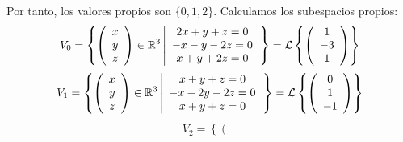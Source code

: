\documentclass[12pt]{article}
\begin{document}
\begin{ejercicio} 
\begin{enumerate}
        Por tanto, los valores propios son $\{0,1,2\}$. Calculamos los subespacios propios:
        \begin{equation*}
            \begin{split}
                V_0 = \left\{\left(\begin{array}{c}
                    x\\y\\z
                \end{array}\right)\in \mathbb{R}^3 \left|
                \begin{array}{c}
                    2x+y+z=0 \\
                    -x-y-2z=0 \\
                    x+y+2z=0
                \end{array}
                \right.\right\}
                = \mathcal{L}\left\{\left(\begin{array}{c}
                    1\\-3\\1
                \end{array}\right)\right\}
            \end{split}
        \end{equation*}
        \begin{equation*}
            \begin{split}
                V_1 = \left\{\left(\begin{array}{c}
                    x\\y\\z
                \end{array}\right)\in \mathbb{R}^3 \left|
                \begin{array}{c}
                    x+y+z=0 \\
                    -x-2y-2z=0 \\
                    x+y+z=0
                \end{array}
                \right.\right\}
                = \mathcal{L}\left\{\left(\begin{array}{c}
                    0\\1\\-1
                \end{array}\right)\right\}
            \end{split}
        \end{equation*}
        \begin{equation*}
            \begin{split}
                V_2 = \left\{\left(\begin{array}{c}

\end{array}
\end{split}
\end{equation*}
\end{enumerate}
\end{ejercicio}
\end{document}
